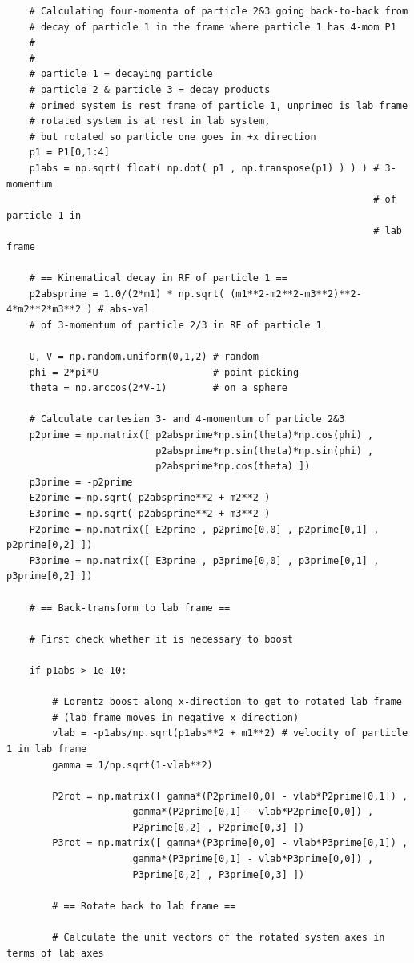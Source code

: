 \documentclass[twoside,english]{uiofysmaster}
\begin{document}
\lstset{language=Python} 
\begin{lstlisting}
	# Calculating four-momenta of particle 2&3 going back-to-back from
	# decay of particle 1 in the frame where particle 1 has 4-mom P1
	#
	#
	# particle 1 = decaying particle
	# particle 2 & particle 3 = decay products
	# primed system is rest frame of particle 1, unprimed is lab frame
	# rotated system is at rest in lab system,
	# but rotated so particle one goes in +x direction
	p1 = P1[0,1:4]
	p1abs = np.sqrt( float( np.dot( p1 , np.transpose(p1) ) ) ) # 3-momentum 
																# of particle 1 in 
												      			# lab frame

	# == Kinematical decay in RF of particle 1 ==
	p2absprime = 1.0/(2*m1) * np.sqrt( (m1**2-m2**2-m3**2)**2- 4*m2**2*m3**2 ) # abs-val
	# of 3-momentum of particle 2/3 in RF of particle 1

	U, V = np.random.uniform(0,1,2) # random 
	phi = 2*pi*U 					# point picking 
	theta = np.arccos(2*V-1) 		# on a sphere

	# Calculate cartesian 3- and 4-momentum of particle 2&3
	p2prime = np.matrix([ p2absprime*np.sin(theta)*np.cos(phi) , 
						  p2absprime*np.sin(theta)*np.sin(phi) , 
						  p2absprime*np.cos(theta) ])
	p3prime = -p2prime
	E2prime = np.sqrt( p2absprime**2 + m2**2 )
	E3prime = np.sqrt( p2absprime**2 + m3**2 )
	P2prime = np.matrix([ E2prime , p2prime[0,0] , p2prime[0,1] , p2prime[0,2] ])
	P3prime = np.matrix([ E3prime , p3prime[0,0] , p3prime[0,1] , p3prime[0,2] ])

	# == Back-transform to lab frame ==

	# First check whether it is necessary to boost

	if p1abs > 1e-10:

		# Lorentz boost along x-direction to get to rotated lab frame
		# (lab frame moves in negative x direction)
	 	vlab = -p1abs/np.sqrt(p1abs**2 + m1**2) # velocity of particle 1 in lab frame
		gamma = 1/np.sqrt(1-vlab**2)

		P2rot = np.matrix([ gamma*(P2prime[0,0] - vlab*P2prime[0,1]) , 
				      gamma*(P2prime[0,1] - vlab*P2prime[0,0]) ,
				      P2prime[0,2] , P2prime[0,3] ])
		P3rot = np.matrix([ gamma*(P3prime[0,0] - vlab*P3prime[0,1]) , 
				      gamma*(P3prime[0,1] - vlab*P3prime[0,0]) ,
				      P3prime[0,2] , P3prime[0,3] ])

		# == Rotate back to lab frame ==

		# Calculate the unit vectors of the rotated system axes in terms of lab axes


\end{lstlisting}
\end{document}
